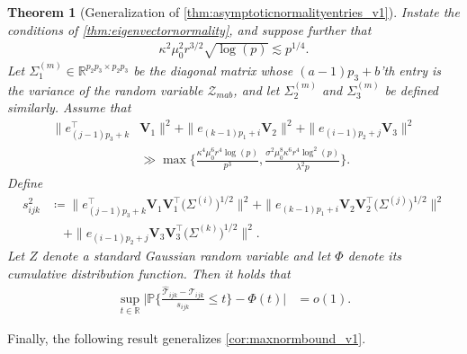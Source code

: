 \documentclass[10pt]{article}
\newcommand{\0}{{\mathbf{0}}}
\newcommand{\1}{{\mathbf{1}}}
\renewcommand{\t}{^{\top}}
\newtheorem{theorem}{Theorem}
\newcommand{\p}{\mathbb{P}}
\renewcommand{\hat}{\widehat}
\renewcommand{\hat}{\widehat}
\begin{document}
 \begin{theorem}[Generalization of \cref{thm:asymptoticnormalityentries_v1}] \label{thm:asymptoticnormalityentries}
 Instate the conditions of \cref{thm:eigenvectornormality}, and suppose further that \begin{align*}
 \kappa^2 \mu_0^2 r^{3/2} \sqrt{\log(p)} \lesssim p^{1/4}.
\end{align*}
Let $\Sigma_1^{(m)} \in \mathbb{R}^{p_2p_3 \times p_2p_3}$ be the diagonal matrix whose $(a-1)p_3 + b$'th entry is the variance of the random variable $\mathcal{Z}_{mab}$, and let $\Sigma_2^{(m)}$ and $\Sigma_{3}^{(m)}$ be defined similarly.  Assume that
\begin{align*}
   \| e_{(j-1)p_3 + k}\t &\mathbf{V}_1 \|^2 + \|e_{(k-1)p_1 + i} \mathbf{V}_2  \|^2 + \| e_{(i-1)p_2 + j} \mathbf{V}_3\|^2 \\
   &\gg \max\bigg\{\frac{ \kappa^4 \mu_0^6 r^4 \log(p)}{p^{3}} ,\frac{\sigma^2\mu_0^8 \kappa^6 r^{4} \log^2(p)}{\lambda^2 p}\bigg\}.
  \end{align*}
Define 
 \begin{align*}
    s^2_{ijk} &\coloneqq  \| e_{(j-1)p_3 + k}\t \mathbf{V}_1 \mathbf{V}_1\t \big(\Sigma^{(i)}\big)^{1/2} \|^2 + \|e_{(k-1)p_1 + i} \mathbf{V}_2 \mathbf{V}_2\t\big(\Sigma^{(j)}\big)^{1/2} \|^2 \\
    &\quad + \| e_{(i-1)p_2 + j} \mathbf{V}_3\mathbf{V}_3\t \big( \Sigma^{(k)} \big)^{1/2}\|^2.
\end{align*}
Let $Z$ denote a standard Gaussian random variable and let $\Phi$ denote its cumulative distribution function. Then it holds that
\begin{align*}
    \sup_{t\in\mathbb{R}} \bigg| \p\bigg\{ \frac{ \mathcal{\hat T}_{ijk} - \mathcal{T}_{ijk}}{s_{ijk}} \leq t \bigg\} - \Phi(t) \bigg| &= o(1).  
\end{align*}
\end{theorem}
\noindent 
Finally, the following result generalizes  \cref{cor:maxnormbound_v1}.  
\end{document}
